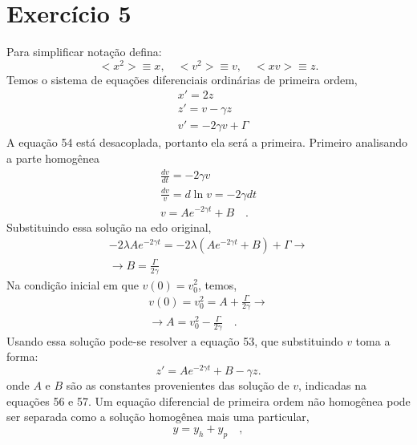 \documentclass[12pt]{article}
\begin{document}
\section*{Exercício 5}
Para simplificar notação defina:
\begin{equation}
<x^2> \equiv x, \quad <v^2> \equiv	 v, \quad <xv> \equiv	 z.
\end{equation}
Temos o sistema de equações diferenciais ordinárias de primeira ordem,
\begin{align}
&x' = 2z\\
&z' = v - \gamma z\\
&v' = -2\gamma v + \Gamma
\end{align}
A equação 54 está desacoplada, portanto ela será a primeira. Primeiro analisando a parte homogênea
\begin{equation}
\begin{split}
\frac{dv}{dt} = -2\gamma v \\
\frac{dv}{v} = d\ln v = -2\gamma dt\\
v = Ae^{-2\gamma t} + B \quad. 
\end{split}
\end{equation}
Substituindo essa solução na edo original, 
\begin{equation}
\begin{split}
-2\lambda Ae^{-2\gamma t} = -2\lambda(Ae^{-2\gamma t} + B) + \Gamma \rightarrow \\
\rightarrow B = \frac{\Gamma}{2\gamma}
\end{split}
\end{equation}
Na condição inicial em que $v(0) = v_0^2$, temos,
\begin{equation}
\begin{split}
v(0) = v_0^2 = A + \frac{\Gamma}{2\gamma} \rightarrow \\
\rightarrow A = v_0^2 - \frac{\Gamma}{2\gamma}\quad . 
\end{split}
\end{equation}
Usando essa solução pode-se resolver a equação 53, que substituindo $v$ toma a forma:
\begin{equation}
z' = Ae^{-2\gamma t} + B - \gamma z.
\end{equation}
onde $A$ e $B$ são as constantes provenientes das solução de $v$, indicadas na equações 56 e 57. 
Um equação diferencial de primeira ordem não homogênea pode ser separada como a solução homogênea mais uma particular, 
\begin{equation}
y = y_h + y_p\quad ,
\end{equation}
\end{document}
